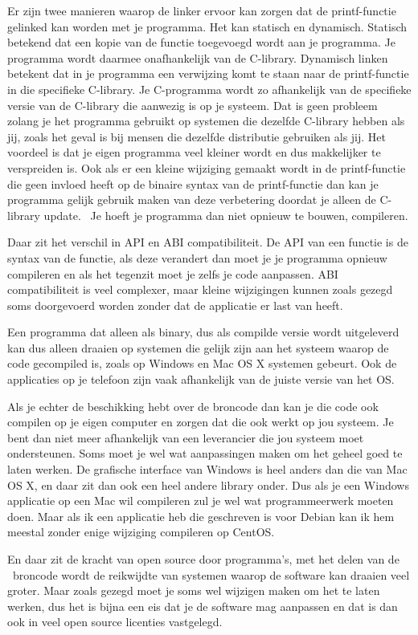 Er zijn twee manieren waarop de linker ervoor kan zorgen dat de printf-functie gelinked kan worden met je programma. Het
kan statisch en dynamisch. Statisch betekend dat een kopie van de functie toegevoegd wordt aan je programma. Je
programma wordt daarmee onafhankelijk van de C-library. Dynamisch linken betekent dat in je programma een verwijzing
komt te staan naar de printf-functie in die specifieke C-library. Je C-programma wordt zo afhankelijk van de specifieke
versie van de C-library die aanwezig is op je systeem. Dat is geen probleem zolang je het programma gebruikt op
systemen die dezelfde C-library hebben als jij, zoals het geval is bij mensen die dezelfde distributie gebruiken als
jij. Het voordeel is dat je eigen programma veel kleiner wordt en dus makkelijker te verspreiden is. Ook als er een
kleine wijziging gemaakt wordt in de printf-functie die geen invloed heeft op de binaire syntax van de printf-functie
dan kan je programma gelijk gebruik maken van deze verbetering doordat je alleen de C-library update. \ Je hoeft je
programma dan niet opnieuw te bouwen, compileren.\par

Daar zit het verschil in API en ABI compatibiliteit. De API van een functie is de syntax van de functie, als deze
verandert dan moet je je programma opnieuw compileren en als het tegenzit moet je zelfs je code aanpassen. ABI
compatibiliteit is veel complexer, maar kleine wijzigingen kunnen zoals gezegd soms doorgevoerd worden zonder dat de
applicatie er last van heeft.\par

Een programma dat alleen als binary, dus als compilde versie wordt uitgeleverd kan dus alleen draaien op systemen die
gelijk zijn aan het systeem waarop de code gecompiled is, zoals op Windows en Mac OS X systemen gebeurt. Ook de
applicaties op je telefoon zijn vaak afhankelijk van de juiste versie van het OS.\par

Als je echter de beschikking hebt over de broncode dan kan je die code ook compilen op je eigen computer en zorgen dat
die ook werkt op jou systeem. Je bent dan niet meer afhankelijk van een leverancier die jou systeem moet ondersteunen.
Soms moet je wel wat aanpassingen maken om het geheel goed te laten werken. De grafische interface van Windows is heel
anders dan die van Mac OS X, en daar zit dan ook een heel andere library onder. Dus als je een Windows applicatie op
een Mac wil compileren zul je wel wat programmeerwerk moeten doen. Maar als ik een applicatie heb die geschreven is
voor Debian kan ik hem meestal zonder enige wijziging compileren op CentOS.\par

En daar zit de kracht van open source door programma's, met het delen van de \ broncode wordt de reikwijdte van systemen
waarop de software kan draaien veel groter. Maar zoals gezegd moet je soms wel wijzigen maken om het te laten werken,
dus het is bijna een eis dat je de software mag aanpassen en dat is dan ook in veel open source licenties vastgelegd.
